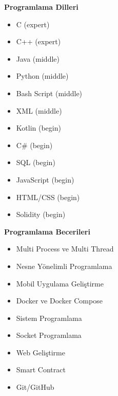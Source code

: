\documentclass[a4paper,11pt]{article}
\begin{document}
\noindent
\begin{minipage}[t]{0.48\textwidth}
    \textbf{Programlama Dilleri}
    \vspace{0.5em}
    \begin{itemize}[leftmargin=2em]
        \item C (expert)
        \item C++ (expert)
        \item Java (middle)
        \item Python (middle)
        \item Bash Script (middle)
        \item XML (middle)
        \item Kotlin (begin)
        \item C\# (begin)
        \item SQL (begin)
		\item JavaScript (begin)
		\item HTML/CSS (begin)
        \item Solidity (begin)
    \end{itemize}
\end{minipage}%
\hfill
\begin{minipage}[t]{0.48\textwidth}
    \textbf{Programlama Becerileri}
    \vspace{0.5em}
    \begin{itemize}[leftmargin=2em]
        \item Multi Process ve Multi Thread
        \item Nesne Yönelimli Programlama
        \item Mobil Uygulama Geliştirme
        \item Docker ve Docker Compose
		\item Sistem Programlama
        \item Socket Programlama
		\item Web Geliştirme
		\item Smart Contract
        \item Git/GitHub	
    \end{itemize}
\end{minipage}
\end{document}
